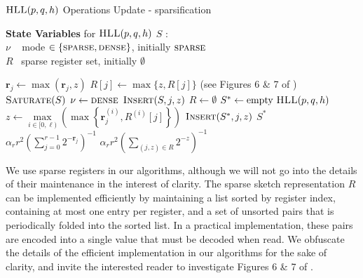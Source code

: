 \documentclass{report}
\newcommand{\algoname}[1]{\textnormal{\textsc{#1}}}
\begin{document}
\begin{algorithm}[htbp] 
\caption{$\algoname{HLL}(p,q,h)$ Operations  Update - sparsification}\label{alg:hll:sparse}
\begin{flushleft}
        \textbf{State Variables} for $\algoname{HLL}(p, q, h)$ $S$ :		\\
    		\hspace{2.65em}	$\nu$  \,\,\, mode $\in \{\algoname{sparse}, \algoname{dense}\}$, initially $\algoname{sparse}$ \\
    		\hspace{2.65em}	$R$  \, sparse register set, initially $\emptyset$
\end{flushleft}
\begin{algorithmic}[1]
		\If {$\nu = \algoname{dense}$}
			\State $\mathbf{r}_j \gets \max ( \mathbf{r}_j, z)$
		\ElsIf {$\nu = \algoname{sparse}$}
			\State $R[j] \gets \max \{z, R[j]\}$ (see Figures 6 \& 7 of \cite{heule2013hyperloglog})
				\State $\algoname{Saturate}(S)$
			\EndIf
		\EndIf
	\EndFunction
%
		\State $\nu \gets \algoname{dense}$
			\State $\algoname{Insert}(S, j, z)$
		\EndFor
		\State $R \gets \emptyset$
	\EndFunction
%
		\State $S^* \gets \text{empty $\algoname{HLL}(p, q, h)$}$
		\For{$j \in [0,r)$} 
			\State $z \gets  \max\limits_{ i \in [0, \ell)} \left ( \max \left \{ \mathbf{r}^{(i)}_j, R^{(i)}[j] \right \} \right )$
				\State $\algoname{Insert}(S^*, j, z)$
			\EndIf
		\EndFor
		\State \Return $S^*$
	\EndFunction
%
		\If{$\nu = \algoname{dense}$}
			\State \Return $\alpha_r r^2 \left ( \sum\limits_{j=0}^{r-1} 2^{-\mathbf{r}_j} \right) ^{-1}$
		\Else
			\State \Return $\alpha_r r^2 \left ( \sum\limits_{(j, z) \in R} 2^{-z} \right) ^{-1}$
		\EndIf
	\EndFunction
\end{algorithmic}
\end{algorithm}


We use sparse registers in our algorithms, although we will not go into the details of their maintenance in the interest of clarity.
The sparse sketch representation $R$ can be implemented efficiently by maintaining a list sorted by register index, containing at most one entry per register, and a set of unsorted pairs that is periodically folded into the sorted list.
In a practical implementation, these pairs are encoded into a single value that must be decoded when read.
We obfuscate the details of the efficient implementation in our algorithms for the sake of clarity, and invite the interested reader to investigate Figures 6 \& 7 of \cite{heule2013hyperloglog}.
\end{document}
